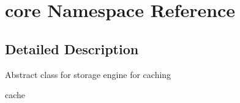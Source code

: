 \hypertarget{namespacecore}{\section{core Namespace Reference}
\label{namespacecore}
}


\subsection{Detailed Description}
Abstract class for storage engine for caching

cache 